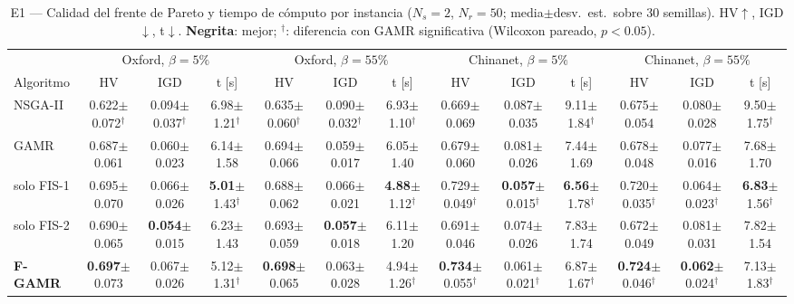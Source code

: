 \begin{table}[!t]
\centering
\caption{E1 --- Calidad del frente de Pareto y tiempo de c\'omputo por instancia ($N_s{=}2$, $N_r{=}50$; media$\pm$desv.\ est.\ sobre 30 semillas). HV$\uparrow$, IGD$\downarrow$, t$\downarrow$. \textbf{Negrita}: mejor; $^\dagger$: diferencia con GAMR significativa (Wilcoxon pareado, $p<0.05$).}
\label{tab:e1moo}
\scriptsize
\setlength{\tabcolsep}{2.2pt}
\begin{tabular}{l|ccc|ccc|ccc|ccc}
\toprule
 & \multicolumn{3}{c|}{Oxford, $\beta{=}5\%$} & \multicolumn{3}{c|}{Oxford, $\beta{=}55\%$} & \multicolumn{3}{c|}{Chinanet, $\beta{=}5\%$} & \multicolumn{3}{c}{Chinanet, $\beta{=}55\%$} \\
Algoritmo & HV & IGD & t [s] & HV & IGD & t [s] & HV & IGD & t [s] & HV & IGD & t [s] \\
\midrule
NSGA-II & 0.622{\tiny$\pm$0.072}$^\dagger$ & 0.094{\tiny$\pm$0.037}$^\dagger$ & 6.98{\tiny$\pm$1.21}$^\dagger$ & 0.635{\tiny$\pm$0.060}$^\dagger$ & 0.090{\tiny$\pm$0.032}$^\dagger$ & 6.93{\tiny$\pm$1.10}$^\dagger$ & 0.669{\tiny$\pm$0.069} & 0.087{\tiny$\pm$0.035} & 9.11{\tiny$\pm$1.84}$^\dagger$ & 0.675{\tiny$\pm$0.054} & 0.080{\tiny$\pm$0.028} & 9.50{\tiny$\pm$1.75}$^\dagger$ \\
GAMR & 0.687{\tiny$\pm$0.061} & 0.060{\tiny$\pm$0.023} & 6.14{\tiny$\pm$1.58} & 0.694{\tiny$\pm$0.066} & 0.059{\tiny$\pm$0.017} & 6.05{\tiny$\pm$1.40} & 0.679{\tiny$\pm$0.060} & 0.081{\tiny$\pm$0.026} & 7.44{\tiny$\pm$1.69} & 0.678{\tiny$\pm$0.048} & 0.077{\tiny$\pm$0.016} & 7.68{\tiny$\pm$1.70} \\
\midrule
solo FIS-1 & 0.695{\tiny$\pm$0.070} & 0.066{\tiny$\pm$0.026} & \textbf{5.01}{\tiny$\pm$1.43}$^\dagger$ & 0.688{\tiny$\pm$0.062} & 0.066{\tiny$\pm$0.021} & \textbf{4.88}{\tiny$\pm$1.12}$^\dagger$ & 0.729{\tiny$\pm$0.049}$^\dagger$ & \textbf{0.057}{\tiny$\pm$0.015}$^\dagger$ & \textbf{6.56}{\tiny$\pm$1.78}$^\dagger$ & 0.720{\tiny$\pm$0.035}$^\dagger$ & 0.064{\tiny$\pm$0.023}$^\dagger$ & \textbf{6.83}{\tiny$\pm$1.56}$^\dagger$ \\
solo FIS-2 & 0.690{\tiny$\pm$0.065} & \textbf{0.054}{\tiny$\pm$0.015} & 6.23{\tiny$\pm$1.43} & 0.693{\tiny$\pm$0.059} & \textbf{0.057}{\tiny$\pm$0.018} & 6.11{\tiny$\pm$1.20} & 0.691{\tiny$\pm$0.046} & 0.074{\tiny$\pm$0.026} & 7.83{\tiny$\pm$1.74} & 0.672{\tiny$\pm$0.049} & 0.081{\tiny$\pm$0.031} & 7.82{\tiny$\pm$1.54} \\
\textbf{F-GAMR} & \textbf{0.697}{\tiny$\pm$0.073} & 0.067{\tiny$\pm$0.026} & 5.12{\tiny$\pm$1.31}$^\dagger$ & \textbf{0.698}{\tiny$\pm$0.065} & 0.063{\tiny$\pm$0.028} & 4.94{\tiny$\pm$1.26}$^\dagger$ & \textbf{0.734}{\tiny$\pm$0.055}$^\dagger$ & 0.061{\tiny$\pm$0.021}$^\dagger$ & 6.87{\tiny$\pm$1.67}$^\dagger$ & \textbf{0.724}{\tiny$\pm$0.046}$^\dagger$ & \textbf{0.062}{\tiny$\pm$0.024}$^\dagger$ & 7.13{\tiny$\pm$1.83}$^\dagger$ \\
\bottomrule
\end{tabular}
\end{table}